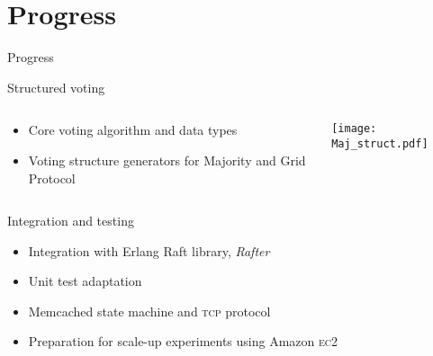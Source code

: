 \documentclass{beamer}
\begin{document}
\section{Progress}
\begin{frame}{Progress}
    \begin{block}{Structured voting}
        \begin{columns}
            \begin{column}{.7\textwidth}
                \begin{itemize}
                    \item Core voting algorithm and data types
                    \item Voting structure generators for Majority and Grid Protocol
                \end{itemize}
            \end{column}
            \begin{column}{.2\textwidth}
                \bigskip

                \hspace*{-12mm}\texttt{[image: Maj\_struct.pdf]}
            \end{column}
        \end{columns}
    \end{block}
    \begin{block}{Integration and testing}
        \begin{itemize}
            \item Integration with Erlang Raft library, \emph{Rafter} %
            \item Unit test adaptation %
            \item Memcached state machine and \textsc{tcp} protocol
            \item Preparation for scale-up experiments using Amazon \textsc{ec2}
        \end{itemize}
    \end{block}
\end{frame}
\end{document}
